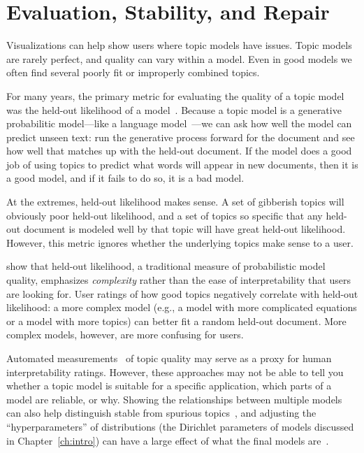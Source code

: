 \section{Evaluation, Stability, and Repair}
\label{sec:coherence}

Visualizations can help show users where topic models have issues.
Topic models are rarely perfect, and quality can vary within a
model. Even in good models we often find several poorly fit or
improperly combined topics. 

For many years, the primary metric for evaluating the quality of a
topic model was the held-out likelihood of a model~\citep{wallach-09a}.
Because a topic model is a generative probabilitic model---like a
language model~\citep{chen-98}---we can ask how well the model can
predict unseen text: run the generative process forward for the
document and see how well that matches up with the held-out document.
If the model does a good job of using topics to predict what words
will appear in new documents, then it is a good model, and if it fails
to do so, it is a bad model.

At the extremes, held-out likelihood makes sense.  
A set of gibberish topics will obviously poor held-out likelihood, and
a set of topics so specific that any held-out document is modeled well
by that topic will have great held-out likelihood.
However, this metric ignores whether the underlying topics make sense
to a user.

\citet{chang-09b} show that
held-out likelihood, a traditional measure of probabilistic model quality,
emphasizes \emph{complexity} rather than the ease of interpretability
that users are looking for.  
User ratings of how good topics negatively correlate with
held-out likelihood: a more complex model (e.g., a model with more
complicated equations or a model with more topics) can better fit a random
held-out document. 
More complex models, however, are more confusing for users. 

Automated measurements~\citep{newman-10,mimno-11,lau-14} of topic
quality may serve as a proxy for human interpretability ratings.
However, these approaches may not be able to tell you
whether a topic model is suitable for a specific application, which parts of a model are reliable, or why.
Showing the relationships between multiple models can also help
distinguish stable from spurious topics~\citep{chuang-15}, and
adjusting the ``hyperparameters'' of distributions (the Dirichlet
parameters of models discussed in Chapter~\ref{ch:intro}) can have a
large effect of what the final models are~\citep{wallach-09b}.

